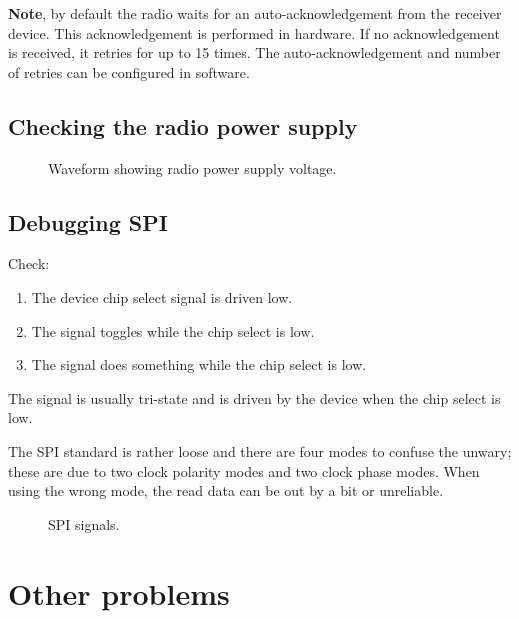 \textbf{Note}, by default the radio waits for an auto-acknowledgement
from the receiver device. This acknowledgement is performed in hardware.
If no acknowledgement is received, it retries for up to 15 times. The
auto-acknowledgement and number of retries can be configured in
software.

\subsection{Checking the radio power supply}
\label{checking-the-radio-power-supply}

\begin{figure}[!h]
  \centering
  \caption{Waveform showing radio power supply voltage.}
\end{figure}


\subsection{Debugging SPI}
\label{debugging-spi}

Check:
%
\begin{enumerate}
\item The device chip select signal is driven low.
\item The  signal toggles while the chip select is low.
\item The  signal does something while the chip select is low.
\end{enumerate}
%
The  signal is usually tri-state and is driven by the
device when the chip select is low.

The SPI standard is rather loose and there are four modes to confuse
the unwary; these are due to two clock polarity modes and two clock
phase modes.  When using the wrong mode, the read data can be out by a
bit or unreliable.

\begin{figure}[!h]
  \centering
  \caption{SPI signals.}
\end{figure}



\section{Other problems}
\label{faq}

